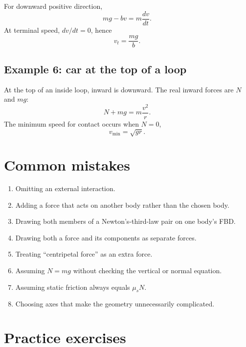 For downward positive direction,
\[
mg-bv=m\frac{dv}{dt}.
\]
At terminal speed, $dv/dt=0$, hence
\[
v_t=\frac{mg}{b}.
\]

\subsection*{Example 6: car at the top of a loop}

At the top of an inside loop, inward is downward.  The real inward forces are $N$ and $mg$:
\[
N+mg=m\frac{v^2}{r}.
\]
The minimum speed for contact occurs when $N=0$,
\[
v_{\min}=\sqrt{gr}.
\]

\section{Common mistakes}

\begin{enumerate}
\item Omitting an external interaction.
\item Adding a force that acts on another body rather than the chosen body.
\item Drawing both members of a Newton's-third-law pair on one body's FBD.
\item Drawing both a force and its components as separate forces.
\item Treating ``centripetal force'' as an extra force.
\item Assuming $N=mg$ without checking the vertical or normal equation.
\item Assuming static friction always equals $\mu_sN$.
\item Choosing axes that make the geometry unnecessarily complicated.
\end{enumerate}

\section{Practice exercises}

